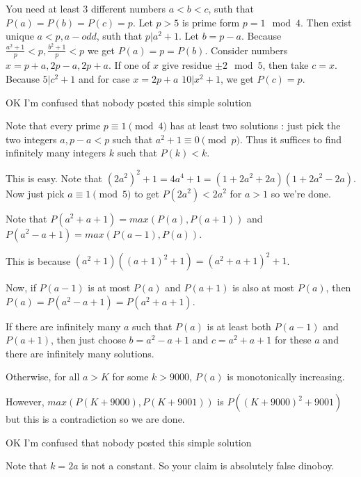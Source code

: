 \begin{solution}
	You need at least 3 different numbers $a<b<c$, suth that $P(a)=P(b)=P(c)=p$.
Let $p>5$ is prime form $p=1\mod 4$.  Then exist unique $a<p, a-odd$, suth that $p|a^2+1$.  Let $b=p-a$. Because $\frac{a^2+1}{p}<p, \frac{b^2+1}{p}<p$ we get $P(a)=p=P(b)$.
Consider numbers $x=p+a,2p-a, 2p+a$.  If one of $x$ give residue $\pm 2\mod 5$, then take $c=x$. Because $5|c^2+1$ and for case $x=2p+a$ $10|x^2+1$, we get $P(c)=p$.
\end{solution}



\begin{solution}
	OK I'm confused that nobody posted this simple solution

Note that every prime $p \equiv 1 \pmod{4}$ has at least two solutions : just pick the two integers $a, p-a < p$ such that $a^2 + 1 \equiv 0 \pmod{p}$. Thus it suffices to find infinitely many integers $k$ such that $P(k) < k$.

This is easy. Note that $(2a^2)^2 + 1 = 4a^4 + 1 = (1 + 2a^2 + 2a)(1 + 2a^2 - 2a)$. Now just pick $a \equiv 1 \pmod{5}$ to get $P(2a^2) < 2a^2$ for $a > 1$ so we're done.
\end{solution}



\begin{solution}
	Note that $P(a^2+a+1)=max(P(a),P(a+1))$ and $P(a^2-a+1)=max(P(a-1),P(a))$.

This is because $(a^2+1)((a+1)^2+1)=(a^2+a+1)^2+1$.

Now, if $P(a-1)$ is at most $P(a)$ and $P(a+1)$ is also at most $P(a)$, then $P(a)=P(a^2-a+1)=P(a^2+a+1)$.

If there are infinitely many $a$ such that $P(a)$ is at least both $P(a-1)$ and $P(a+1)$, then just choose $b=a^2-a+1$ and $c=a^2+a+1$ for these $a$ and there are infinitely many solutions.

Otherwise, for all $a>K$ for some $k>9000$, $P(a)$ is monotonically increasing.

However, $max(P(K+9000),P(K+9001))$ is $P((K+9000)^2+9001)$ but this is a contradiction so we are done.
\end{solution}



\begin{solution}
	\begin{tcolorbox}OK I'm confused that nobody posted this simple solution\end{tcolorbox}
Note that $k=2a$ is not a constant. So your claim is absolutely false dinoboy.
\end{solution}




